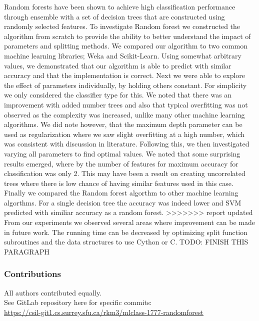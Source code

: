 \documentclass{article} %
\begin{document}
Random forests have been shown to achieve high classification performance through ensemble with a set of decision trees that are constructed using randomly selected features. To investigate Random forest we constructed the algorithm from scratch to provide the ability to better understand the impact of parameters and splitting methods. We compared our algorithm to two common machine learning libraries; Weka and Scikit-Learn. Using somewhat arbitrary values, we demonstrated that our algorithm is able to predict with similar accuracy and that the implementation is correct. Next we were able to explore the effect of parameters individually, by holding others constant. For simplicity we only considered the classifier type for this. We noted that there was an improvement with added number trees and also that typical overfitting was not observed as the complexity was increased, unlike many other machine learning algorithms. We did note however, that the maximum depth parameter can be used as regularization where we saw slight overfitting at a high number, which was consistent with discussion in literature. Following this, we then investigated varying all parameters to find optimal values. We noted that some surprising results emerged, where by the number of features for maximum accuracy for classification was only 2. This may have been a result on creating uncorrelated trees where there is low chance of having similar features used in this case. Finally we compared the Random forest algorthm to other machine learning algorthms. For a single decision tree the accuracy was indeed lower and SVM predicted with similiar accuracy as a random forest.
>>>>>>> report updated
From our experiments we observed several areas where improvement can be made in future work. The running time can be decreased by optimizing split function subroutines and the data structures to use Cython or C.
TODO: FINISH THIS PARAGRAPH

\subsubsection*{Contributions}
All authors contributed equally.\\
See GitLab repository here for specific commits:\\
\href{
    https://csil-git1.cs.surrey.sfu.ca/rkm3/mlclass-1777-randomforest
}{
    https://csil-git1.cs.surrey.sfu.ca/rkm3/mlclass-1777-randomforest
}


\small{


}
\end{document}
